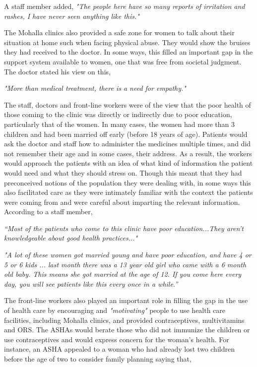 A staff member added,
\textit{"The people here have so many reports of irritation and rashes, I have never seen anything like this."}

The Mohalla clinics also provided a safe zone for women to talk about their situation at home such when facing physical abuse. They would show the bruises they had received to the doctor. In some ways, this filled an important gap in the support system available to women, one that was free from societal judgment. The doctor stated his view on this, 

\textit{"More than medical treatment, there is a need for empathy."}

The staff, doctors and front-line workers were of the view that the poor health of those coming to the clinic was directly or indirectly due to poor education, particularly that of the women. In many cases, the women had more than 3 children and had been married off early (before 18 years of age). Patients would ask the doctor and staff how to administer the medicines multiple times, and did not remember their age and in some cases, their address. As a result, the workers would approach the patients with an idea of what kind of information the patient would need and what they should stress on. Though this meant that they had preconceived notions of the population they were dealing with, in some ways this also facilitated care as they were intimately familiar with the context the patients were coming from and were careful about imparting the relevant information. According to a staff member,

\textit{“Most of the patients who come to this clinic have poor education...They aren’t knowledgeable about good health practices..."}

\textit{"A lot of these women got married young and have poor education, and have 4 or 5 or 6 kids ... last month there was a 13 year old girl who came with a 6 month old baby. This means she got married at the age of 12. If you come here every day, you will see patients like this every once in a while.”}

The front-line workers also played an important role in filling the gap in the use of health care by encouraging and \textit{"motivating"} people to use health care facilities, including Mohalla clinics, and provided contraceptives, multivitamins and ORS. The ASHAs would berate those who did not immunize the children or use contraceptives and would express concern for the woman's health. For instance, an ASHA appealed to a woman who had already lost two children before the age of two to consider family planning saying that, 

